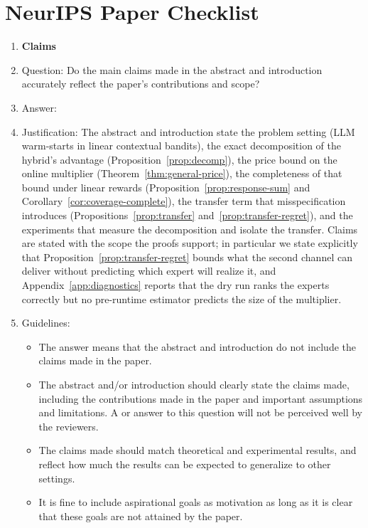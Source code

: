 \documentclass{article}
\theoremstyle{definition}
\theoremstyle{remark}
\theoremstyle{remark}
\begin{document}
\section*{NeurIPS Paper Checklist}




\begin{enumerate}

\item {\bf Claims}
    \item[] Question: Do the main claims made in the abstract and introduction accurately reflect the paper's contributions and scope?
    \item[] Answer: \answerYes{} %
    \item[] Justification: The abstract and introduction state the problem setting (LLM warm-starts in linear contextual bandits), the exact decomposition of the hybrid's advantage (Proposition~\ref{prop:decomp}), the price bound on the online multiplier (Theorem~\ref{thm:general-price}), the completeness of that bound under linear rewards (Proposition~\ref{prop:response-sum} and Corollary~\ref{cor:coverage-complete}), the transfer term that misspecification introduces (Propositions~\ref{prop:transfer} and~\ref{prop:transfer-regret}), and the experiments that measure the decomposition and isolate the transfer. Claims are stated with the scope the proofs support; in particular we state explicitly that Proposition~\ref{prop:transfer-regret} bounds what the second channel can deliver without predicting which expert will realize it, and Appendix~\ref{app:diagnostics} reports that the dry run ranks the experts correctly but no pre-runtime estimator predicts the size of the multiplier.
    \item[] Guidelines:
    \begin{itemize}
        \item The answer \answerNA{} means that the abstract and introduction do not include the claims made in the paper.
        \item The abstract and/or introduction should clearly state the claims made, including the contributions made in the paper and important assumptions and limitations. A \answerNo{} or \answerNA{} answer to this question will not be perceived well by the reviewers. 
        \item The claims made should match theoretical and experimental results, and reflect how much the results can be expected to generalize to other settings. 
        \item It is fine to include aspirational goals as motivation as long as it is clear that these goals are not attained by the paper. 
    \end{itemize}


\end{enumerate}
\end{document}
